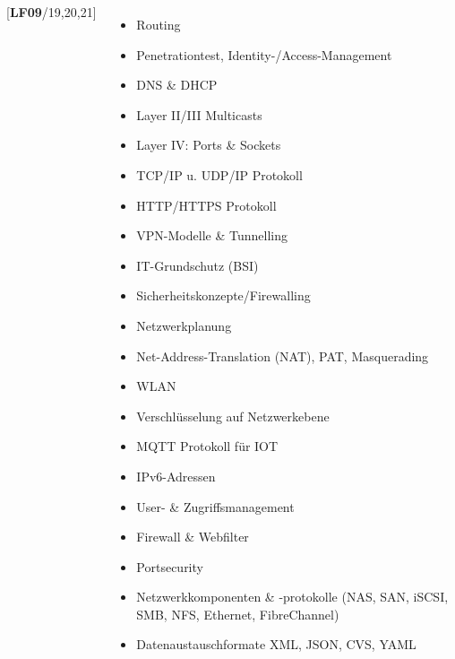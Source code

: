 \begin{frame}
\begin{tiny}
\begin{columns}[T]
  [\textbf{LF09}/19,20,21]
    \begin{itemize}
      \item[\faSquareO] Routing
      \item[\faSquareO] Penetrationtest, Identity-/Access-Management 
      \item[\faSquareO] DNS \& DHCP 
      \item[\faSquareO] Layer II/III Multicasts 
      \item[\faSquareO] Layer IV: Ports \& Sockets 
      \item[\faSquareO] TCP/IP u. UDP/IP Protokoll 
      \item[\faSquareO] HTTP/HTTPS Protokoll 
      \item[\faSquareO] VPN-Modelle \& Tunnelling 
      \item[\faSquareO] IT-Grundschutz (BSI) 
      \item[\faSquareO] Sicherheitskonzepte/Firewalling 
      \item[\faSquareO] Netzwerkplanung 
      \item[\faSquareO] Net-Address-Translation (NAT), PAT, Masquerading 
      \item[\faSquareO] WLAN 
      \item[\faSquareO] Verschlüsselung auf Netzwerkebene 
      \item[\faSquareO] MQTT Protokoll für IOT
      \item[\faSquareO] IPv6-Adressen 
      \item[\faSquareO] User- \& Zugriffsmanagement 
      \item[\faSquareO] Firewall \& Webfilter 
      \item[\faSquareO] Portsecurity 
      \item[\faSquareO] Netzwerkkomponenten \& -protokolle (NAS, SAN, iSCSI, SMB, NFS, Ethernet, FibreChannel)
      \item[\faSquareO] Datenaustauschformate XML, JSON, CVS, YAML 
    \end{itemize} 
  \end{columns}
  \end{tiny}
\end{frame}